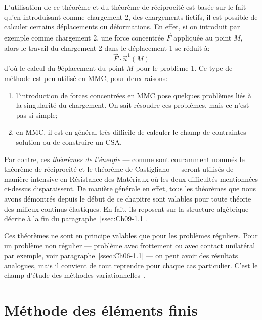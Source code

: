 L'utilisation de ce théorème et du théorème de réciprocité est basée sur le fait qu'en introduisant comme chargement 2, des chargements fictifs, il est possible de calculer certains déplacements ou déformations.
En effet, si on introduit par exemple comme chargement 2, une force concentrée $\vec{F}$ appliquée au point $M$, alors le travail du  chargement 2 dans le déplacement 1 se réduit à:
\begin{equation}
    \vec{F}\cdot \vec{u}^1 \left( M\right)
    \label{eq:Ch09-063}
\end{equation}
d'où le calcul du 9éplacement du point $M$ pour le problème 1.
Ce type de méthode est peu utilisé en MMC, pour deux raisons: 
\begin{enumerate}
    \item l'introduction de forces concentrées en MMC pose quelques problèmes liés à la singularité du chargement.
        On sait résoudre ces problèmes, mais ce n'est pas si simple;
    \item en MMC, il est en général très difficile de calculer le champ de contraintes solution ou de construire un CSA. 
\end{enumerate}
Par contre, ces \emph{théorèmes de l'énergie} --- comme sont couramment nommés le théorème de réciprocité et le théorème de Castigliano --- seront utilisés de manière intensive en Résistance des Matériaux où les deux difficultés mentionnées ci-dessus disparaissent.
De manière générale en effet, tous les théorèmes que nous avons démontrés depuis le début de ce chapitre sont valables pour toute théorie des milieux continus élastiques.
En fait, ils reposent sur la structure algébrique décrite à la fin du paragraphe~\ref{ssec:Ch09-1.1}.

Ces théorèmes ne sont en principe valables que pour les problèmes réguliers.
Pour un problème non régulier --- problème avec frottement ou avec contact unilatéral par exemple, voir paragraphe~\ref{ssec:Ch06-1.1} --- on peut avoir des résultats analogues, mais il convient de tout reprendre pour chaque cas particulier.
C'est le champ d'étude des méthodes variationnelles~\cite{Duvaut-72}. 
\section{Méthode des éléments finis} \label{sec:Ch09-3}
